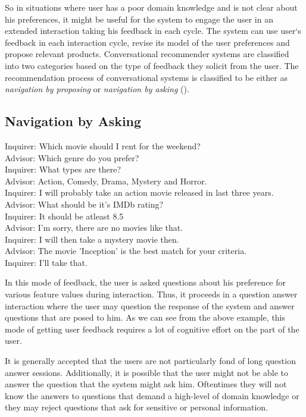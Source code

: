So in situations where user has a poor domain knowledge and is not clear about his preferences, it might be useful for the system to engage the user in an extended interaction taking his feedback in each cycle.
The system can use user`s feedback in each interaction cycle, revise its model of the user preferences and propose relevant products.
Conversational recommender systems are classified into two categories based on the type of feedback they solicit from the user.
The recommendation process of conversational systems is classified to be either as \textit{navigation by proposing} or \textit{navigation by asking} (\cite{shimazu01}).

\subsection{Navigation by Asking}
\begin{mdframed}
%
Inquirer:  Which movie should I rent for the weekend?\\
Advisor:   Which genre do you prefer? \\
Inquirer:  What types are there? \\
Advisor:   Action, Comedy, Drama, Mystery and Horror. \\
Inquirer:  I will probably take an action movie released in last three years. \\
Advisor:   What should be it's IMDb rating?\\
Inquirer:  It should be atleast 8.5 \\
Advisor: I'm sorry, there are no movies like that. \\
Inquirer:  I will then take a mystery movie then. \\
Advisor:  The movie 'Inception' is the best match for your criteria. \\
Inquirer:  I'll take that. \\
\end{mdframed}

In this mode of feedback, the user is asked questions about his preference for various feature values during interaction.
Thus, it proceeds in a question answer interaction where the user may question the response of the system and answer questions that are posed to him.
As we can see from the above example, this mode of getting user feedback requires a lot of cognitive effort on the part of the user.

It is generally accepted that the users are not particularly fond of long question answer sessions. 
Additionally, it is possible that the user might not be able to answer the question that the system might ask him. 
Oftentimes they will not know the answers to questions that demand a high-level of domain knowledge or they may reject questions that ask for sensitive or personal information.






